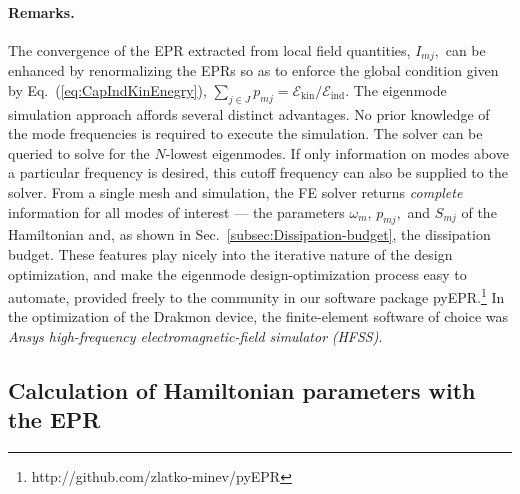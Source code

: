 \paragraph{Remarks.}

The convergence of the EPR extracted from local field quantities,
$I_{mj},$ can be enhanced by renormalizing the EPRs so as to enforce
the global condition given by Eq.~(\ref{eq:CapIndKinEnegry}), $\sum_{j\in J}p_{mj}=\mathcal{E}_{\mathrm{kin}}/\mathcal{E}_{\mathrm{ind}}$.
The eigenmode simulation approach affords several distinct advantages.
No prior knowledge of the mode frequencies is required to execute
the simulation. The solver can be queried to solve for the $N$-lowest
eigenmodes. If only information on modes above a particular frequency
is desired, this cutoff frequency can also be supplied to the solver.
From a single mesh and simulation, the FE solver returns \emph{complete}
information for all modes of interest — the parameters $\omega_{m}$,
$p_{mj},$ and $S_{mj}$ of the Hamiltonian and, as shown in Sec.~\ref{subsec:Dissipation-budget},
the dissipation budget. These features play nicely into the iterative
nature of the design optimization, and make the eigenmode design-optimization
process easy to automate, provided freely to the community in our
software package pyEPR.\footnote{http://github.com/zlatko-minev/pyEPR}
In the optimization of the Drakmon device, the finite-element software
of choice was \emph{Ansys high-frequency electromagnetic-field simulator}
\emph{(HFSS)}.

\subsection{Calculation of Hamiltonian parameters with the EPR\label{subsec:Calculation-of-Hamiltonian}}

